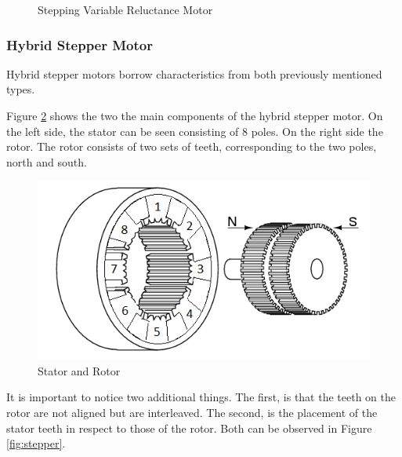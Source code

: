 \begin{figure}[htp]
\begin{center}
{        }
    \hfill
  	\hfill
  	\caption{Stepping Variable Reluctance Motor}
  	\label{fig:stepping_var_rel}
  	\end{center}
\end{figure}
\newpage
\subsubsection{Hybrid Stepper Motor}
Hybrid stepper motors borrow characteristics from both previously mentioned types.

Figure \ref{fig:hybrid_components} shows the two the main components of the hybrid stepper motor. On the left side, the stator can be seen consisting of 8 poles. On the right side the rotor. The rotor consists of two sets of teeth, corresponding to the two poles, north and south.
\begin{figure}[h]
	\centering
	\includegraphics[width=\textwidth]{figures/move/motor27.png}
	\caption{Stator and Rotor}
	\label{fig:hybrid_components}
\end{figure}

It is important to notice two additional things. The first, is that the teeth on the rotor are not aligned but are interleaved. The second, is the placement of the stator teeth in respect to those of the rotor. Both can be observed in Figure \ref{fig:stepper}.


